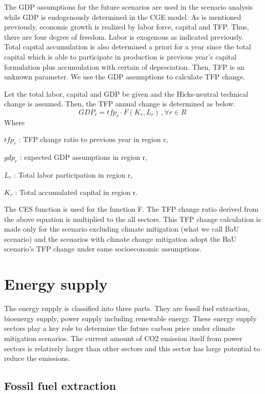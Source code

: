\documentclass[10pt,a4paper,titlepage,dvipdfmx]{book}
\begin{document}
The GDP assumptions for the future scenarios are used in the scenario analysis while GDP is endogenously determined in the CGE model. As is mentioned previously, economic growth is realized by labor force, capital and TFP. Thus, there are four degree of freedom. Labor is exogenous as indicated previously. Total capital accumulation is also determined a priori for a year since the total capital which is able to participate in production is previous year's capital formulation plus accumulation with certain of depreciation. Then, TFP is an unknown parameter. We use the GDP assumptions to calculate TFP change.

Let the total labor, capital and GDP be given and the Hicks-neutral technical change is assumed. Then, the TFP annual change is determined as below.
\begin{equation}
\tag{2}
GDP_{r}=tfp_{r}\cdot F\left(K_{r},L_{r}\right)\,,\forall r\in R
\end{equation}
{Where} 

$tfp_{r}$  : TFP change ratio to previous year in region r,

$gdp_{r}$  : expected GDP assumptions in region r,

$L_{r}$  : Total labor participation in region r,

$K_{r}$  : Total accumulated capital in region r.

The CES function is used for the function F. The TFP change ratio derived from the above equation is multiplied to the all sectors. This TFP change calculation is made only for the scenario excluding climate mitigation (what we call BaU scenario) and the scenarios with climate change mitigation adopt the BaU scenario's TFP change under same socioeconomic assumptions.

\section{\label{sec:EneSup}{Energy supply}}

The energy supply is classified into three parts. They are fossil fuel extraction, bioenergy supply, power supply including renewable energy. These energy supply sectors play a key role to determine the future carbon price under climate mitigation scenarios. The current amount of CO2 emission itself from power sectors is relatively larger than other sectors and this sector has large potential to reduce the emissions.

\subsection{\label{subsec:FosFueExt}Fossil fuel extraction}
\end{document}
